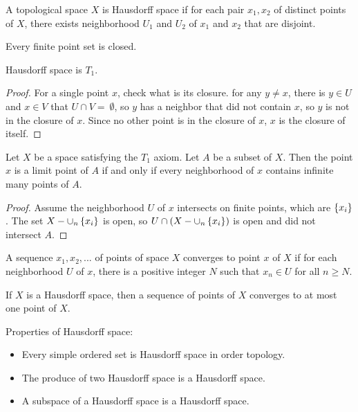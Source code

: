 \begin{definition}
    A topological space $X$ is Hausdorff space if for each pair $x_1, x_2$ of distinct points of $X$, there exists neighborhood $U_1$ and $U_2$ of $x_1$ and $x_2$ that are disjoint.
\end{definition}

\begin{definition}
Every finite point set is closed.    
\end{definition}

\begin{theorem}
    Hausdorff space is $T_1$.
\end{theorem}
\begin{proof}
    For a single point $x$, check what is its closure. for any $y \neq x$, there is $y \in U$ and $x \in V$ that $U \cap V = \ \emptyset$, so $y$ has a neighbor that did not contain $x$, so $y$ is not in the closure of $x$. Since no other point is in the closure of $x$, $x$ is the closure of itself.
\end{proof}


\begin{theorem}
Let $X$ be a space satisfying the $T_1$ axiom. Let $A$ be a subset of $X$. Then the point $x$ is a limit point of $A$ if and only if every neighborhood of $x$ contains infinite many points of $A$.    
\end{theorem}
\begin{proof}
    Assume the neighborhood $U$ of $x$ intersects on finite points, which are $\set{x_i}$. The set $X - \cup_n \set{x_i}$ is open, so $U \cap (X - \cup_n \set{x_i})$ is open and did not intersect $A$.
\end{proof}


\begin{definition}
    A sequence $x_1, x_2, ... $ of points of space $X$ converges to point $x$ of $X$ if for each neighborhood $U$ of $x$, there is a positive integer $N$ such that $x_n \in U$ for all $n \geq N$.
\end{definition}

\begin{theorem}
If $X$ is a Hausdorff space, then a sequence of points of $X$ converges to at most one point of $X$.    
\end{theorem}

\begin{theorem}
Properties of Hausdorff space:
\begin{itemize}
    \item Every simple ordered set is Hausdorff space in order topology.
    \item The produce of two Hausdorff space is a Hausdorff space.
    \item A subspace of a Hausdorff space is a Hausdorff space. 
\end{itemize}
\end{theorem}




